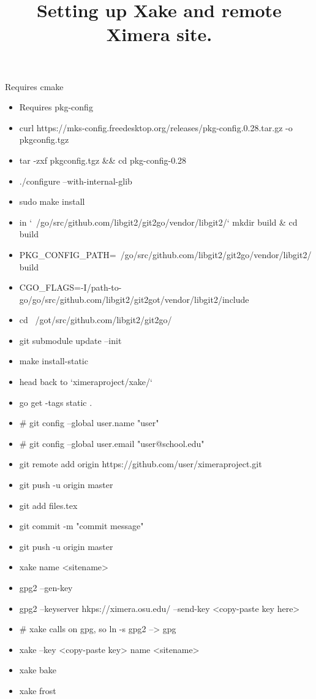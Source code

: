 \documentclass{ximera}
\begin{document}
\title{Setting up Xake and remote Ximera site.}

Requires cmake

\begin{itemize}
\item Requires pkg-config
\item curl https://mks-config.freedesktop.org/releases/pkg-config.0.28.tar.gz -o pkgconfig.tgz
\item tar -zxf pkgconfig.tgz && cd pkg-config-0.28
\item ./configure --with-internal-glib
\item sudo make install
\end{itemize}

\begin{itemize}
\item in `~/go/src/github.com/libgit2/git2go/vendor/libgit2/` mkdir build & cd build
\item PKG_CONFIG_PATH=~/go/src/github.com/libgit2/git2go/vendor/libgit2/build
\item CGO_FLAGS=-I/path-to-go/go/src/github.com/libgit2/git2got/vendor/libgit2/include
\item cd ~/got/src/github.com/libgit2/git2go/ 
\item git submodule update --init
\item make install-static
\item head back to `ximeraproject/xake/`
\item go get -tags static .
\end{itemize}

\begin{itemize}
\item # git config --global user.name "user"
\item # git config --global user.email "user@school.edu"
\item git remote add origin https://github.com/user/ximeraproject.git
\item git push -u origin master
\item git add files.tex
\item git commit -m "commit message"
\item git push -u origin master
\item xake name <sitename>
\item gpg2  --gen-key
\item gpg2 --keyserver hkps://ximera.osu.edu/ --send-key <copy-paste key here>
\item # xake calls on gpg, so ln -s gpg2 --> gpg
\item xake --key <copy-paste key> name <sitename>
\item xake bake
\item xake frost
\end{itemize}
\end{document}
